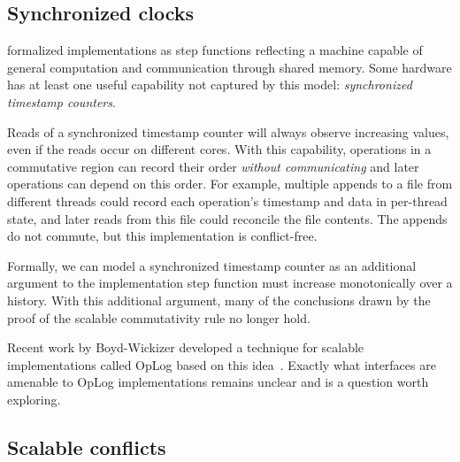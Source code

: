 

\subsection{Synchronized clocks}
\label{sec:future-work:clocks}

 formalized implementations as step
functions reflecting a machine capable of general computation and
communication through shared memory.
%
Some hardware has at least one useful capability not captured by this
model: \emph{synchronized timestamp counters}.

%

Reads of a synchronized timestamp counter will always observe
increasing values, even if the reads occur on different cores.
%
%
With this capability, operations in a commutative region can record
their order \emph{without communicating} and later operations can
depend on this order.
%
For example, multiple appends to a file from different threads could
record each operation's timestamp and data in per-thread state, and
later reads from this file could reconcile the file contents.  The
appends do not commute, but this implementation is conflict-free.

Formally, we can model a synchronized timestamp counter as an
additional argument to the implementation step function must increase
monotonically over a history.  With this additional argument, many of
the conclusions drawn by the proof of the scalable commutativity rule
no longer hold.

Recent work by Boyd-Wickizer developed a technique for scalable
implementations called OpLog based on this
idea~\cite{boyd-wickizer:thesis}.  Exactly what interfaces are
amenable to OpLog implementations remains unclear and is a question
worth exploring.


\subsection{Scalable conflicts}

